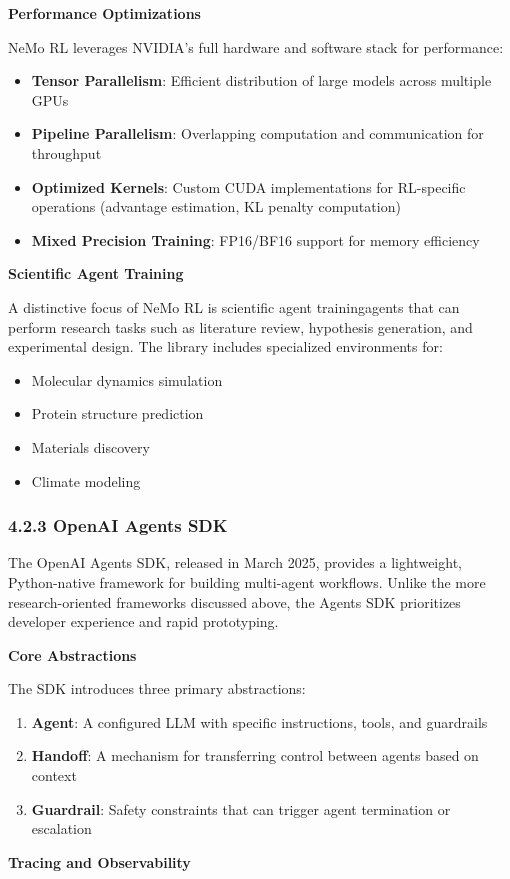 \textbf{Performance Optimizations}

NeMo RL leverages NVIDIA's full hardware and software stack for performance:

\begin{itemize}
    \item \textbf{Tensor Parallelism}: Efficient distribution of large models across multiple GPUs
    \item \textbf{Pipeline Parallelism}: Overlapping computation and communication for throughput
    \item \textbf{Optimized Kernels}: Custom CUDA implementations for RL-specific operations (advantage estimation, KL penalty computation)
    \item \textbf{Mixed Precision Training}: FP16/BF16 support for memory efficiency

\end{itemize}
\textbf{Scientific Agent Training}

A distinctive focus of NeMo RL is scientific agent trainingagents that can perform research tasks such as literature review, hypothesis generation, and experimental design. The library includes specialized environments for:

\begin{itemize}
    \item Molecular dynamics simulation
    \item Protein structure prediction
    \item Materials discovery
    \item Climate modeling

\end{itemize}
\subsubsection{4.2.3 OpenAI Agents SDK}

The OpenAI Agents SDK, released in March 2025, provides a lightweight, Python-native framework for building multi-agent workflows. Unlike the more research-oriented frameworks discussed above, the Agents SDK prioritizes developer experience and rapid prototyping.

\textbf{Core Abstractions}

The SDK introduces three primary abstractions:

\begin{enumerate}
    \item \textbf{Agent}: A configured LLM with specific instructions, tools, and guardrails
    \item \textbf{Handoff}: A mechanism for transferring control between agents based on context
    \item \textbf{Guardrail}: Safety constraints that can trigger agent termination or escalation

\end{enumerate}
\textbf{Tracing and Observability}

